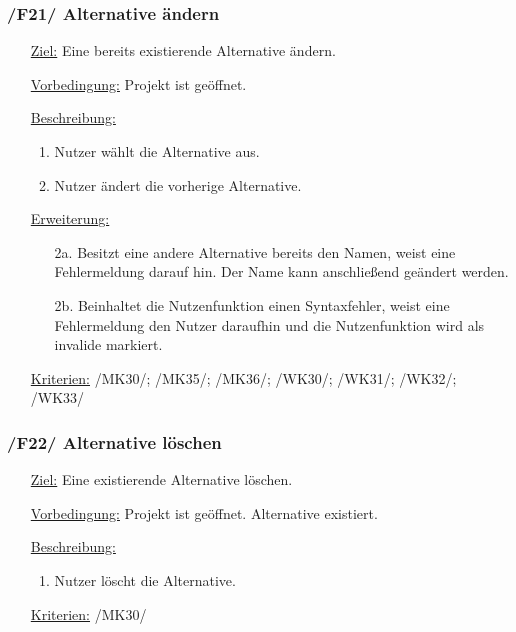 \documentclass{article}
\begin{document}
\subsubsection*{\textbf{/F21/} Alternative ändern} \label{sec:f:Alternative ändern}
\begin{itemize}
    \item[\underline{Ziel:}] Eine bereits existierende Alternative ändern.
    \item[\underline{Vorbedingung:}] Projekt ist geöffnet. 
    \item[\underline{Beschreibung:}]
    \begin{enumerate}
        \item Nutzer wählt die Alternative aus.
        \item Nutzer ändert die vorherige Alternative.
    \end{enumerate}
    \item[\underline{Erweiterung:}]
    \begin{itemize}
        \item[2a.] Besitzt eine andere Alternative bereits den Namen, weist eine Fehlermeldung darauf hin. Der Name kann anschließend geändert werden.
        \item[2b.] Beinhaltet die Nutzenfunktion einen Syntaxfehler, weist eine Fehlermeldung den Nutzer daraufhin und die Nutzenfunktion wird als invalide markiert. 
    \end{itemize}
    \item[\underline{Kriterien:}] /MK30/; /MK35/; /MK36/; /WK30/; /WK31/; /WK32/; /WK33/
\end{itemize}

\subsubsection*{\textbf{/F22/} Alternative löschen} \label{sec:f:Alternative löschen}
\begin{itemize}
    \item[\underline{Ziel:}] Eine existierende Alternative löschen.
    \item[\underline{Vorbedingung:}] Projekt ist geöffnet. Alternative existiert.
    \item[\underline{Beschreibung:}]
    \begin{enumerate}
        \item Nutzer löscht die Alternative.
    \end{enumerate}
    \item[\underline{Kriterien:}] /MK30/
\end{itemize}
\end{document}
